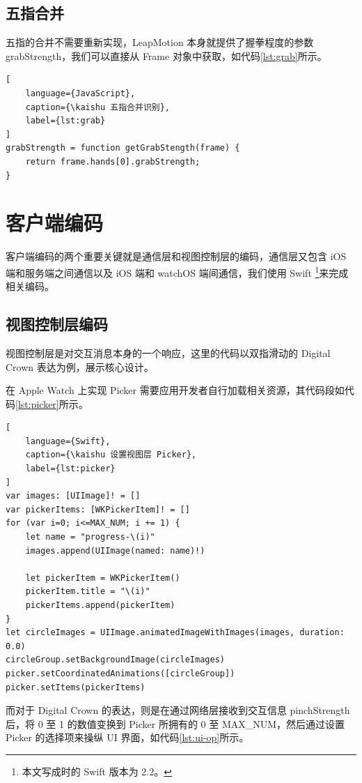 \subsection{五指合并}

五指的合并不需要重新实现，LeapMotion 本身就提供了握拳程度的参数 grabStrength，我们可以直接从 Frame 对象中获取，如代码\ref{lst:grab}所示。

\begin{lstlisting}[
    language={JavaScript},
    caption={\kaishu 五指合并识别},
    label={lst:grab}
]
grabStrength = function getGrabStength(frame) {
    return frame.hands[0].grabStrength;
}
\end{lstlisting}

\section{客户端编码}

客户端编码的两个重要关键就是通信层和视图控制层的编码，通信层又包含 iOS 端和服务端之间通信以及 iOS 端和 watchOS 端间通信，我们使用 Swift \footnote{本文写成时的 Swift 版本为 2.2。}来完成相关编码\cite{swift2015, swiftoc2015}。

\subsection{视图控制层编码}

视图控制层是对交互消息本身的一个响应，这里的代码以双指滑动的 Digital Crown 表达为例，展示核心设计。

在 Apple Watch 上实现 Picker 需要应用开发者自行加载相关资源，其代码段如代码\ref{lst:picker}所示。

\begin{lstlisting}[
    language={Swift},
    caption={\kaishu 设置视图层 Picker},
    label={lst:picker}
]
var images: [UIImage]! = []
var pickerItems: [WKPickerItem]! = []
for (var i=0; i<=MAX_NUM; i += 1) {
    let name = "progress-\(i)"
    images.append(UIImage(named: name)!)

    let pickerItem = WKPickerItem()
    pickerItem.title = "\(i)"
    pickerItems.append(pickerItem)
}
let circleImages = UIImage.animatedImageWithImages(images, duration: 0.0)
circleGroup.setBackgroundImage(circleImages)
picker.setCoordinatedAnimations([circleGroup])
picker.setItems(pickerItems)
\end{lstlisting}

而对于 Digital Crown 的表达，则是在通过网络层接收到交互信息 pinchStrength 后，将 0 至 1 的数值变换到 Picker 所拥有的 0 至 MAX\_NUM，然后通过设置 Picker 的选择项来操纵 UI 界面，如代码\ref{lst:ui-op}所示。

